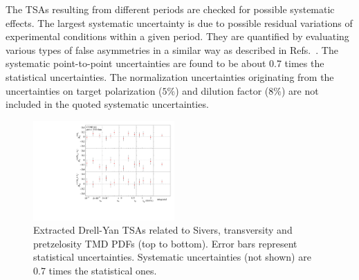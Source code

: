 \documentclass[a4paper,manyauthors,nocleardouble,COMPASS]{cernphprep}
\newcommand{\gvc}{GeV/$c$}
\begin{document}


The TSAs resulting from different periods are checked for possible systematic effects. The largest systematic uncertainty is due to possible residual variations of experimental conditions within a given period. They are quantified by evaluating various types of false asymmetries in a similar way as described in Refs.~\cite{Adolph:2012sp,Adolph:2012sn}. The systematic point-to-point uncertainties are found to be about 0.7 times the statistical uncertainties.
The normalization uncertainties originating from the uncertainties on target polarization ($5\%$) and dilution factor ($8\%$) are not included in the quoted systematic uncertainties.
%
%
%
%
%
%
\begin{figure}[tbp]
\centering
\includegraphics[width=0.48\textwidth]{plots/TSAs_3in1_15.pdf}
\caption{Extracted Drell-Yan TSAs related to Sivers, transversity and pretzelosity TMD PDFs (top to bottom). Error bars represent statistical uncertainties. Systematic uncertainties (not shown) are 0.7 times the statistical ones.}
\label{fig:TSAs}
\end{figure}
%
\end{document}
